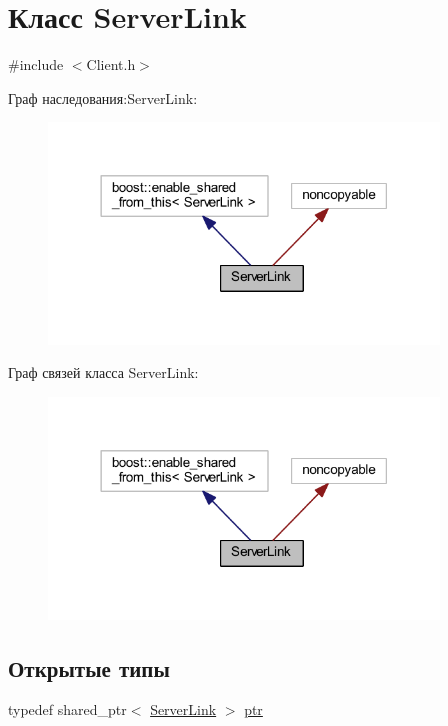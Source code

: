 \hypertarget{class_server_link}{}\section{Класс Server\+Link}
\label{class_server_link}


{\ttfamily \#include $<$Client.\+h$>$}



Граф наследования\+:Server\+Link\+:
\nopagebreak
\begin{figure}[H]
\begin{center}
\leavevmode
\includegraphics[width=294pt]{class_server_link__inherit__graph}
\end{center}
\end{figure}


Граф связей класса Server\+Link\+:
\nopagebreak
\begin{figure}[H]
\begin{center}
\leavevmode
\includegraphics[width=294pt]{class_server_link__coll__graph}
\end{center}
\end{figure}
\subsection*{Открытые типы}
\begin{DoxyCompactItemize}
\item 
typedef shared\+\_\+ptr$<$ \mbox{\hyperlink{class_server_link}{Server\+Link}} $>$ \mbox{\hyperlink{class_server_link_afb05b9f4060b17ac50d2fb3b874ce236}{ptr}}
\end{DoxyCompactItemize}
